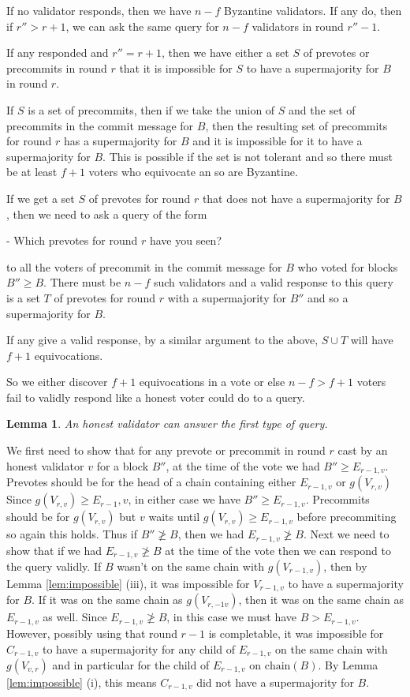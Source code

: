 \documentclass{article}
\newtheorem{lemma}[theorem]{Lemma}
\begin{document}
{If no validator responds, then we  have $n-f$ Byzantine validators. If any do, then if $r'' > r+1$,  we can ask the same query for $n-f$ validators in round $r''-1$.

If any responded and $r''=r+1$, then we have either a set $S$ of prevotes or precommits in round $r$ that it is impossible for $S$ to have a supermajority for $B$ in round $r$.

If $S$ is a set of precommits, then if we take the union of $S$ and the set of precommits in the commit message for $B$, then the resulting set of precommits for round $r$ has a supermajority for $B$ and it is impossible for it to have a supermajority for $B$. This is possible if the set is not tolerant and so there must be at least $f+1$ voters who equivocate an so are Byzantine.

If we get a set $S$ of prevotes for round $r$ that does not have a supermajority for $B$, then we need to ask a query of the form

- Which prevotes for round $r$ have you seen?

to all the voters of precommit in the commit message for $B$  who voted for blocks $B'' \geq B$. There must be $n-f$ such validators and a valid response to this query is a set $T$ of prevotes for round $r$ with a supermajority for $B''$ and so a supermajority for $B$.

If any give a valid response, by a similar argument to the above, $S \cup T$ will have $f+1$ equivocations.

So we either discover $f+1$ equivocations in a vote or else $n-f > f+1$ voters fail to validly respond like a honest voter could do to a query.


\begin{lemma} \label{lem:honest-answer}
An honest validator can answer the first type of query.
\end{lemma}
We first need to show that for any prevote or precommit in round $r$ cast by an honest validator $v$ for a block $B''$, at the time of the vote we had $B'' \geq E_{r-1,v}$. Prevotes should be for the head of a chain containing either $E_{r-1,v}$ or $g(V_{r,v})$ Since $g(V_{r,v}) \geq E_{r-1},v$, in either case we have $B'' \geq E_{r-1,v}$. Precommits should be for $g(V_{r,v})$ but $v$ waits until $g(V_{r,v}) \geq E_{r-1,v}$ before precommiting so again this holds.
Thus if $B'' \not\geq B$, then we had $E_{r-1,v} \not\geq B$.
Next we need to show that if we had $E_{r-1,v} \not\geq B$ at the time of the vote then we can respond to the query validly. 
If $B$ wasn't on the same chain with $g(V_{r-1,v})$, then by Lemma \ref{lem:impossible} (iii), it was impossible for $V_{r-1,v}$ to have a supermajority for $B$. If it was on the same chain as $g(V_{r,-1v})$, then it was on the same chain as $E_{r-1,v}$ as well.
Since $E_{r-1,v} \not\geq B$, in this case we must have $B > E_{r-1,v}$. However, possibly using that round $r-1$ is completable, it was impossible for $C_{r-1,v}$ to have a supermajority for any child of $E_{r-1,v}$ on the same chain with $g(V_{v,r})$ and in particular for the child of $E_{r-1,v}$ on $\textrm{chain}(B)$. By Lemma \ref{lem:impossible} (i), this means $C_{r-1,v}$ did not have a supermajority for $B$.

}
\end{document}

